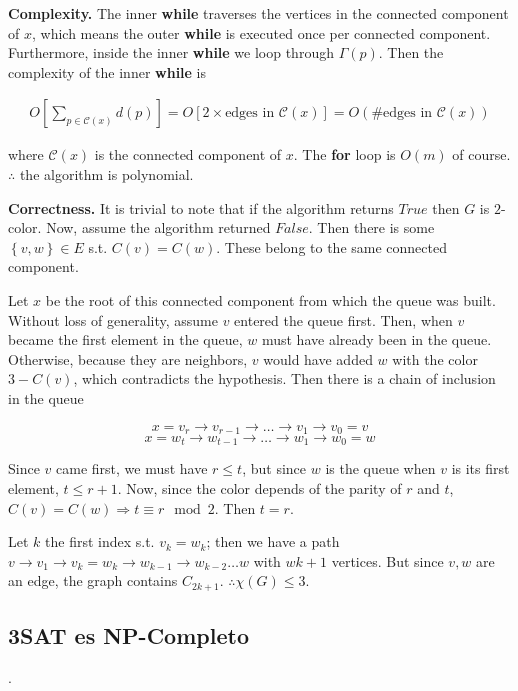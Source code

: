 \documentclass[a4paper, 12pt]{article}
\begin{document}
\textbf{Complexity.} The inner \textbf{while} traverses the vertices in the
connected component of $x$, which means the outer \textbf{while} is executed
once per connected component. Furthermore, inside the inner \textbf{while} we
loop through $\Gamma(p)$. Then the complexity of the inner \textbf{while} is 

\begin{align*} O \left[ \sum_{p \in \mathcal{C}(x)} d(p) \right] = O \left[ 2
\times \text{edges in } \mathcal{C}(x) \right]  = O(\# \text{edges in }
\mathcal{C}(x)) \end{align*}

where $\mathcal{C}(x)$ is the connected component of $x$. The \textbf{for} loop
is $O(m)$ of course. $\therefore $ the algorithm is polynomial.

\textbf{Correctness.} It is trivial to note that if the algorithm returns
$True$ then $G$ is $2$-color. Now, assume the algorithm returned $False$. Then
there is some $\left\{ v, w \right\} \in E$ s.t. $C(v) = C(w)$. These belong to
the same connected component.

Let $x$  be the root of this connected component from which the queue was
built. Without loss of generality, assume $v$ entered the queue first. 
Then, when $v$ became the first element in the queue, $w$ must have 
already been in the queue. Otherwise, because they are neighbors, $v$
would have added $w$ with the color $3 - C(v)$, which contradicts the 
hypothesis. Then there is a chain of inclusion in the queue

$$x = v_r \to v_{r-1} \to  \ldots \to v_1 \to  v_0 = v$$
$$x = w_t \to w_{t-1} \to  \ldots \to w_1 \to  w_0 = w$$

Since $v$ came first, we must have $r \leq t$, but since $w$ is the queue when
$v$ is its first element, $t \leq r+1$. Now, since the color depends of the
parity of $r$ and $t$, $C(v) = C(w) \Rightarrow t \equiv r \mod 2$. Then $t =
r$.

Let $k$ the first index s.t. $v_k = w_k$; then we have a path $v \to  v_1 \to
v_k = w_k \to  w_{k-1} \to  w_{k-2} \ldots w$ with $wk + 1$ vertices. But since
$v, w$ are an edge, the graph contains $C_{2k+1}$. $\therefore \chi(G) \leq 3$.




\pagebreak

\subsection{3SAT es NP-Completo}.
\end{document}
